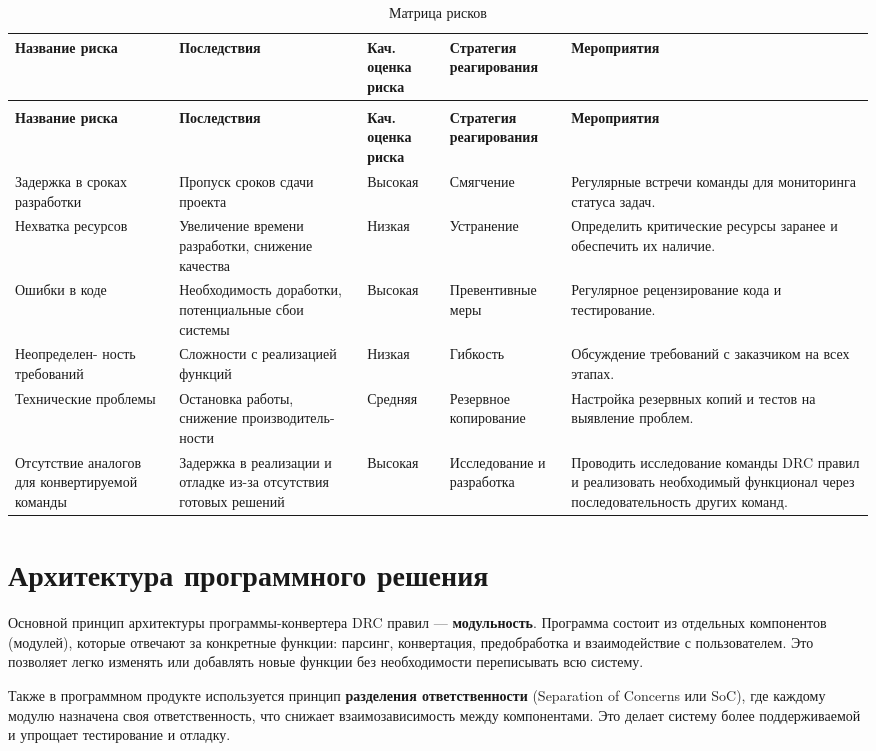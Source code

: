 \begin{longtable}{|p{3.2cm}|p{3.2cm}|p{2cm}|p{3cm}|p{4cm}|}
	\caption{Матрица рисков} \label{table:risk:matrix} \\
	\hline
	\textbf{Название риска}
	& \textbf{Последствия}
	& \textbf{Кач. оценка риска}
	& \textbf{Стратегия реагирования}
	& \textbf{Мероприятия} \\ \hline
	\endfirsthead
	\conttable{table:risk:matrix} \\
	\hline
	\textbf{Название риска}
	& \textbf{Последствия}
	& \textbf{Кач. оценка риска}
	& \textbf{Стратегия реагирования}
	& \textbf{Мероприятия} \\ \hline
	\endhead
	Задержка в сроках разработки
	& Пропуск сроков сдачи проекта
	& Высокая
	& Смягчение 
	& Регулярные встречи команды для мониторинга статуса задач. \\ \hline
	Нехватка ресурсов
	& Увеличение времени разработки, снижение качества
	& Низкая
	& Устранение
	& Определить критические ресурсы заранее и обеспечить их наличие. \\ \hline
	Ошибки в коде
	& Необходимость доработки, потенциальные сбои системы
	& Высокая
	& Превентивные меры
	& Регулярное рецензирование кода и тестирование. \\ \hline
	Неопределен- ность требований
	& Сложности с реализацией функций
	& Низкая
	& Гибкость
	& Обсуждение требований с заказчиком на всех этапах. \\ \hline
	Технические проблемы
	& Остановка работы, снижение производитель- ности
	& Средняя
	& Резервное копирование
	& Настройка резервных копий и тестов на выявление проблем. \\ \hline
	Отсутствие аналогов для конвертируемой команды
	& Задержка в реализации и отладке из-за отсутствия готовых решений
	& Высокая
	& Исследование и разработка
	& Проводить исследование команды DRC правил
	и реализовать необходимый функционал через последовательность
	других команд. \\ \hline
\end{longtable}

\section{Архитектура программного решения}

Основной принцип архитектуры программы-конвертера DRC правил
--- \textbf{модульность}.
Программа состоит из отдельных компонентов (модулей),
которые отвечают за конкретные функции:
парсинг, конвертация, предобработка и взаимодействие с пользователем.
Это позволяет легко изменять или добавлять новые функции
без необходимости переписывать всю систему.\par
Также в программном продукте используется принцип
\textbf{разделения ответственности} 
(Separation of Concerns или SoC), где каждому модулю назначена
своя ответственность, что снижает взаимозависимость между компонентами.
Это делает систему более поддерживаемой и упрощает тестирование и отладку.

